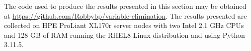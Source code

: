 \documentclass[smallextended]{svjour3}
\begin{document}
The code used to produce the results presented in this section may be obtained
at \url{https://github.com/Robbybp/variable-elimination}.
The results presented are collected on HPE ProLiant XL170r server nodes with
two Intel 2.1 GHz CPUs and 128 GB of RAM running the RHEL8 Linux distribution
and using Python 3.11.5.

\end{document}
